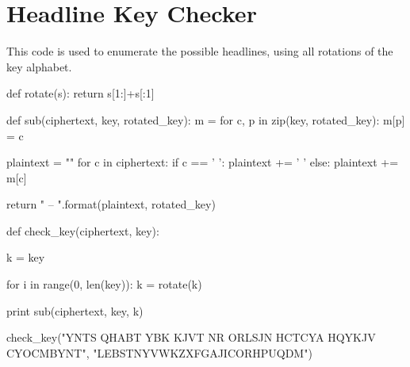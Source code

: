 \documentclass[11pt,a4paper,twoside]{article}
\begin{document}
\section{Headline Key Checker}
\label{Headline_checker}
This code is used to enumerate the possible headlines, using all rotations of the key alphabet. 
\begin{python}
def rotate(s):
    return s[1:]+s[:1]

def sub(ciphertext, key, rotated_key):
    m = {}
    for c, p in zip(key, rotated_key):
        m[p] = c
    
    plaintext = ""
    for c in ciphertext:
        if c == ' ':
            plaintext += ' '
        else:
            plaintext += m[c]
    
    return "{} -- {}".format(plaintext, rotated_key)
    

def check_key(ciphertext, key):
    
    k = key
    
    for i in range(0, len(key)):
        k = rotate(k)
        
        print sub(ciphertext, key, k)


check_key("YNTS QHABT YBK KJVT NR ORLSJN HCTCYA HQYKJV CYOCMBYNT", 
          "LEBSTNYVWKZXFGAJICORHPUQDM")
\end{python}

\end{document}
